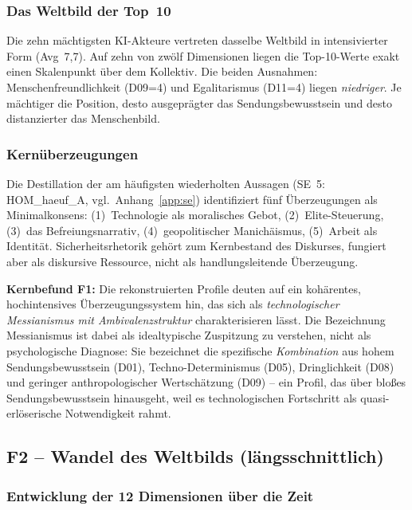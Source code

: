 \documentclass[12pt,a4paper]{article}
\begin{document}
\subsubsection{\texorpdfstring{Das Weltbild der Top~10}{Das Weltbild der Top 10}}

Die zehn mächtigsten KI-Akteure vertreten dasselbe Weltbild in intensivierter Form (Avg~7,7). Auf zehn von zwölf Dimensionen liegen die Top-10-Werte exakt einen Skalenpunkt über dem Kollektiv. Die beiden Ausnahmen: Menschenfreundlichkeit (D09=4) und Egalitarismus (D11=4) liegen \emph{niedriger}. Je mächtiger die Position, desto ausgeprägter das Sendungsbewusstsein und desto distanzierter das Menschenbild.


\subsubsection{Kernüberzeugungen}

Die Destillation der am häufigsten wiederholten Aussagen (SE~5: HOM\_haeuf\_A, vgl.\ Anhang~\ref{app:se}) identifiziert fünf Überzeugungen als Minimalkonsens: (1)~Technologie als moralisches Gebot, (2)~Elite-Steuerung, (3)~das Befreiungsnarrativ, (4)~geopolitischer Manichäismus, (5)~Arbeit als Identität. Sicherheitsrhetorik gehört zum Kernbestand des Diskurses, fungiert aber als diskursive Ressource, nicht als handlungsleitende Überzeugung.

\medskip
\noindent\textbf{Kernbefund F1:} Die rekonstruierten Profile deuten auf ein kohärentes, hochintensives Überzeugungssystem hin, das sich als \emph{technologischer Messianismus mit Ambivalenzstruktur} charakterisieren lässt. Die Bezeichnung \glqq Messianismus\grqq{} ist dabei als idealtypische Zuspitzung zu verstehen, nicht als psychologische Diagnose: Sie bezeichnet die spezifische \emph{Kombination} aus hohem Sendungsbewusstsein (D01), Techno-Determinismus (D05), Dringlichkeit (D08) und geringer anthropologischer Wertschätzung (D09) -- ein Profil, das über bloßes Sendungsbewusstsein hinausgeht, weil es technologischen Fortschritt als quasi-erlöserische Notwendigkeit rahmt.


\subsection{F2 -- Wandel des Weltbilds (längsschnittlich)}
\label{sec:ergebnisse:f2}

\subsubsection{Entwicklung der 12 Dimensionen über die Zeit}
\end{document}
